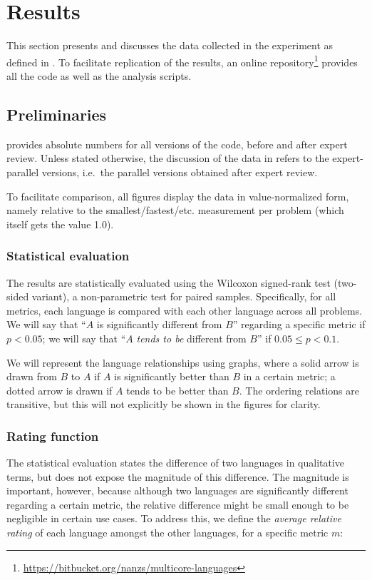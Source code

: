 \section{Results}
\label{sec:results}

This section presents and discusses the data collected in the experiment as defined in . To facilitate replication of the results, an online repository\footnote{\url{https://bitbucket.org/nanzs/multicore-languages}} provides all the code as well as the analysis scripts. 

\subsection{Preliminaries}
\label{sec:preliminaries}

 provides absolute numbers for all versions of the code, before and after expert review. 
Unless stated otherwise, the discussion of the data in  refers to the expert-parallel versions, i.e.\ the parallel versions obtained after expert review.

To facilitate comparison, all figures display the data in value-normalized form, namely relative to the smallest/fastest/etc. measurement per problem (which itself gets the value 1.0).

\subsubsection{Statistical evaluation} The results are statistically evaluated using the Wilcoxon signed-rank test (two-sided variant), a non-parametric test for paired samples. Specifically, for all metrics, each language is compared with each other language across all problems. We will say that ``$A$ is significantly different from $B$'' regarding a specific metric if $p < 0.05$; we will say that ``$A$ \emph{tends to be} different from $B$'' if $0.05 \leq p < 0.1$. 

We will represent the language relationships using graphs, where a solid arrow is drawn from $B$ to $A$ if $A$ is significantly better than $B$ in a certain metric; a dotted arrow is drawn if $A$ tends to be better than $B$. The ordering relations are transitive, but this will not explicitly be shown in the figures for clarity.

\subsubsection{Rating function} The statistical evaluation states the difference of two languages in qualitative terms, but does not expose the magnitude of this difference. The magnitude is important, however, because although two languages are significantly different regarding a certain metric, the relative difference might be small enough to be negligible in certain use cases. To address this, we define the \emph{average relative rating} of each language amongst the other languages, for a specific metric $m$:

